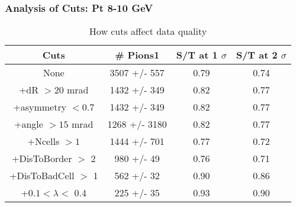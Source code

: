 \frame
{
\frametitle{Analysis of Cuts: Pt  8-10 GeV}
\begin{table}
\caption{How cuts affect data quality}
\centering
\begin{tabular}{c c c c}
\hline\hline
Cuts & \# Pions1 & S/T at 1 $\sigma$ & S/T at 2 $\sigma$ \\ [0.5ex]
\hline
None & 3507 +/-  557 & 0.79 & 0.74 \\ %
+dR $> 20$ mrad & 1432 +/-  349 & 0.82 & 0.77 \\ %
+asymmetry $< 0.7$ & 1432 +/-  349 & 0.82 & 0.77 \\ %
+angle $> 15$ mrad & 1268 +/- 3180 & 0.82 & 0.77 \\ %
+Ncells $> 1$& 1444 +/-  701 & 0.77 & 0.72 \\ %
+DisToBorder $>$ 2 &  980 +/-   49 & 0.76 & 0.71 \\ %
+DisToBadCell $>$ 1&  562 +/-   32 & 0.90 & 0.86 \\ %
+$0.1 < \lambda <$ 0.4 &  225 +/-   35 & 0.93 & 0.90 \\ %
[1ex]
\hline
\end{tabular}
\label{table:nonlin}
\end{table}
}
